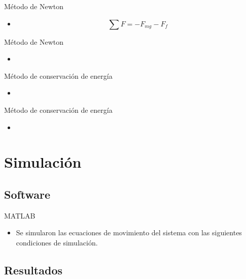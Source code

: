 \documentclass{beamer}
\begin{document}
\begin{frame}{Método de Newton}

\begin{itemize}
 \item 
 \begin{equation}
  \sum F = -F_{mg} - F_f 
 \end{equation}

\end{itemize}

\end{frame}

\begin{frame}{Método de Newton}
\begin{itemize}
 \item 
\end{itemize}
\end{frame}

\begin{frame}{Método de conservación de energía}
 \begin{itemize}
  \item   
 \end{itemize}
\end{frame}


\begin{frame}{Método de conservación de energía}
\begin{itemize}
 \item
\end{itemize}
\end{frame}


\section{Simulación}
\subsection{Software}
\begin{frame}{MATLAB}
 \begin{itemize}
  \item Se simularon las ecuaciones de movimiento del sistema con las siguientes condiciones de simulación.
 \end{itemize}

\end{frame}


\subsection{Resultados}
\end{document}
